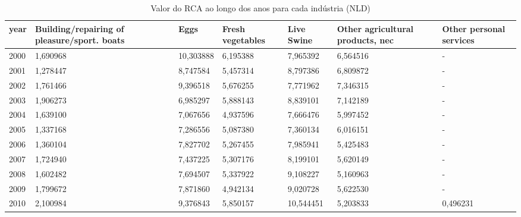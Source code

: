 \begin{table}
\centering
\caption{Valor do RCA ao longo dos anos para cada indústria (NLD)}
\begin{tabular}{p{1cm}p{2cm}p{2cm}p{2cm}p{2cm}p{2cm}p{2cm}}
\toprule
 year &  Building/repairing of pleasure/sport. boats &      Eggs &  Fresh vegetables &  Live Swine &  Other agricultural products, nec &  Other personal services \\
\midrule
 2000 &                                     1,690968 & 10,303888 &          6,195388 &    7,965392 &                          6,564516 &                        - \\
 2001 &                                     1,278447 &  8,747584 &          5,457314 &    8,797386 &                          6,809872 &                        - \\
 2002 &                                     1,761466 &  9,396518 &          5,676255 &    7,771962 &                          7,346315 &                        - \\
 2003 &                                     1,906273 &  6,985297 &          5,888143 &    8,839101 &                          7,142189 &                        - \\
 2004 &                                     1,639100 &  7,067656 &          4,937596 &    7,666476 &                          5,997452 &                        - \\
 2005 &                                     1,337168 &  7,286556 &          5,087380 &    7,360134 &                          6,016151 &                        - \\
 2006 &                                     1,360104 &  7,827702 &          5,267455 &    7,985941 &                          5,425483 &                        - \\
 2007 &                                     1,724940 &  7,437225 &          5,307176 &    8,199101 &                          5,620149 &                        - \\
 2008 &                                     1,602482 &  7,694507 &          5,337922 &    9,108227 &                          5,160963 &                        - \\
 2009 &                                     1,799672 &  7,871860 &          4,942134 &    9,020728 &                          5,622530 &                        - \\
 2010 &                                     2,100984 &  9,376843 &          5,850157 &   10,544451 &                          5,203833 &                 0,496231 \\

\end{tabular}
\end{table}
